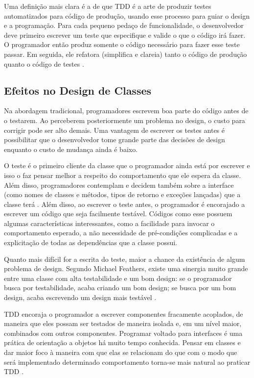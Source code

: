 Uma definição mais clara é a de que TDD é a arte de produzir testes
automatizados para código de produção, usando esse processo para guiar o design e a programação.
Para cada pequeno pedaço de funcionalidade, o desenvolvedor deve primeiro
escrever um teste que especifique e valide o que o código irá fazer. O
programador então produz somente o código necessário para fazer esse teste
passar. Em seguida, ele refatora (simplifica e clareia) tanto o código de produção
quanto o código de testes \cite{agilealliance-tdd} \cite{tdd-taxonomy}.

\subsection{Efeitos no Design de Classes}

Na abordagem tradicional, programadores escrevem boa parte do código antes de
o testarem. Ao perceberem posteriormente um problema no design, o custo para
corrigir pode ser alto demais. Uma vantagem de escrever os testes antes é
possibilitar que o desenvolvedor tome grande parte das decisões de design
enquanto o custo de mudança ainda é baixo.

O teste é o primeiro cliente da
classe que o programador ainda está por escrever e isso o faz pensar
melhor a respeito do comportamento que ele espera da classe. Além disso,
programadores contemplam e decidem também sobre a interface (como nomes de
classes e métodos, tipos de retorno e exceções lançadas) que a classe terá
\cite{janzen-saiedian}.
Além disso, ao escrever o teste antes, o programador é encorajado a escrever um
código que seja facilmente testável. Códigos como esse possuem algumas
características interessantes, como a facilidade para invocar o comportamento
esperado, a não necessidade de pré-condições complicadas e a explicitação de
todas as dependências que a classe possui.

Quanto mais difícil for a escrita do teste, maior a chance da existência de
algum problema de design. Segundo Michael Feathers, existe uma sinergia muito
grande entre uma classe com alta testabilidade e um bom design: se o
programador busca por testabilidade, acaba criando um bom design; se 
busca por um bom design, acaba escrevendo um design mais
testável \cite{feathers-synergy}.

TDD encoraja o programador a escrever componentes fracamente acoplados, de
maneira que eles possam ser testados de maneira isolada e, em um nível maior,
combinados com outros componentes.
Programar voltado para interfaces é uma prática de orientação a objetos há muito
tempo conhecida. Pensar em classes e dar maior foco à maneira com que
elas se relacionam do que com o modo que será implementado determinado
comportamento torna-se mais natural ao praticar TDD \cite{GOOS}. 


